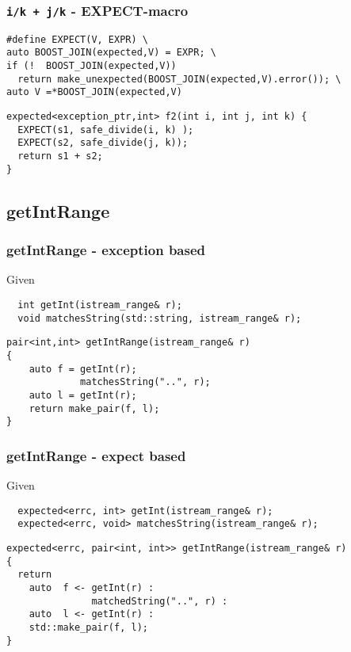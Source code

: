\documentclass[xcolor=dvipsnames]{beamer}
\newcommand{\cpp}[1]{\lstinline{#1}}
\begin{document}
\begin{frame}[fragile]
\frametitle{\cpp{i/k + j/k}  - EXPECT-macro}

\begin{lstlisting}
#define EXPECT(V, EXPR) \
auto BOOST_JOIN(expected,V) = EXPR; \
if (!  BOOST_JOIN(expected,V)) 
  return make_unexpected(BOOST_JOIN(expected,V).error()); \
auto V =*BOOST_JOIN(expected,V)
\end{lstlisting}

\begin{lstlisting}
expected<exception_ptr,int> f2(int i, int j, int k) {
  EXPECT(s1, safe_divide(i, k) );
  EXPECT(s2, safe_divide(j, k));
  return s1 + s2;
}
\end{lstlisting}

\end{frame}


\subsection{getIntRange }

\begin{frame}[fragile]
\frametitle{getIntRange - exception based}

Given
\begin{lstlisting}
  int getInt(istream_range& r);
  void matchesString(std::string, istream_range& r);
\end{lstlisting}

\begin{lstlisting}
pair<int,int> getIntRange(istream_range& r) 
{
    auto f = getInt(r);
             matchesString("..", r);
    auto l = getInt(r);       
    return make_pair(f, l);
}
\end{lstlisting}

\end{frame}
\begin{frame}[fragile]
\frametitle{getIntRange - expect based}

Given
\begin{lstlisting}
  expected<errc, int> getInt(istream_range& r);
  expected<errc, void> matchesString(istream_range& r);
\end{lstlisting}

\begin{lstlisting}
expected<errc, pair<int, int>> getIntRange(istream_range& r) 
{
  return 
    auto  f <- getInt(r) : 
               matchedString("..", r) : 
    auto  l <- getInt(r) :
    std::make_pair(f, l);
}
\end{lstlisting}

\end{frame}
\end{document}
